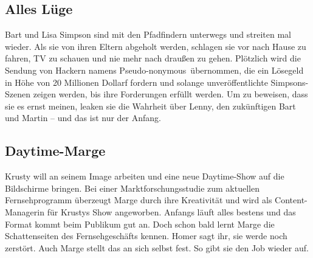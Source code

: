 \subsection{Alles Lüge}
Bart und Lisa Simpson sind mit den Pfadfindern unterwegs und streiten mal wieder. Als sie von ihren Eltern abgeholt werden, schlagen sie vor nach Hause zu fahren, TV zu schauen und nie mehr nach draußen zu gehen. Plötzlich wird die Sendung von Hackern namens \glqq Pseudo-nonymous\grqq\ übernommen, die ein Lösegeld in Höhe von 20 Millionen Dollarf fordern und solange unveröffentlichte Simpsons-Szenen zeigen werden, bis ihre Forderungen erfüllt werden. Um zu beweisen, dass sie es ernst meinen, leaken sie die Wahrheit über Lenny, den zukünftigen Bart und Martin -- und das ist nur der Anfang.


\subsection{Daytime-Marge}
Krusty will an seinem Image arbeiten und eine neue Daytime-Show auf die Bildschirme bringen. Bei einer Marktforschungsstudie zum aktuellen Fernsehprogramm überzeugt Marge durch ihre Kreativität und wird als Content-Managerin für Krustys Show angeworben. Anfangs läuft alles bestens und das Format kommt beim Publikum gut an. Doch schon bald lernt Marge die Schattenseiten des Fernsehgeschäfts kennen. Homer sagt ihr, sie werde noch zerstört. Auch Marge stellt das an sich selbst fest. So gibt sie den Job wieder auf.


